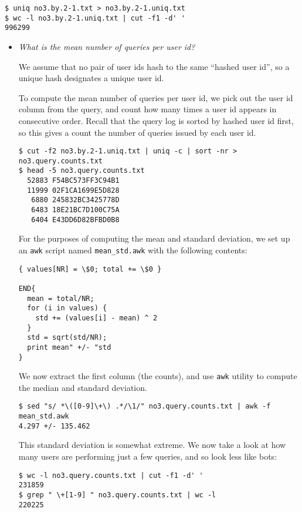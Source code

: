 \begin{lstlisting}
$ uniq no3.by.2-1.txt > no3.by.2-1.uniq.txt
$ wc -l no3.by.2-1.uniq.txt | cut -f1 -d' '
996299
\end{lstlisting}

\begin{itemize}

\item \emph{What is the mean number of queries per user id?}

We assume that no pair of user ids hash to the same ``hashed user id'',
so a unique hash designates a unique user id.

To compute the mean number of queries per user id, we pick out the user id
column from the query, and count how many times a user id appears in
consecutive order. Recall that the query log is sorted by hashed user id first,
so this gives a count the number of queries issued by each user id.

\begin{lstlisting}
$ cut -f2 no3.by.2-1.uniq.txt | uniq -c | sort -nr > no3.query.counts.txt
$ head -5 no3.query.counts.txt 
  52883 F54BC573FF3C94B1
  11999 02F1CA1699E5D828
   6880 245832BC3425778D
   6483 18E21BC7D100C75A
   6404 E43DD6D82BFBD0B8
\end{lstlisting}

For the purposes of computing the mean and standard deviation, we set up an
\texttt{awk} script named \texttt{mean\_std.awk} with the following contents:

\begin{lstlisting}
{ values[NR] = \$0; total += \$0 }

END{
  mean = total/NR;
  for (i in values) {
    std += (values[i] - mean) ^ 2
  }
  std = sqrt(std/NR);
  print mean" +/- "std
}
\end{lstlisting}

We now extract the first column (the counts), and use \texttt{awk} utility to
compute the median and standard deviation.

\begin{lstlisting}
$ sed "s/ *\([0-9]\+\) .*/\1/" no3.query.counts.txt | awk -f mean_std.awk
4.297 +/- 135.462
\end{lstlisting}

This standard deviation is somewhat extreme. We now take a look at how many
users are performing just a few queries, and so look less like bots:

\begin{lstlisting}
$ wc -l no3.query.counts.txt | cut -f1 -d' '
231859
$ grep " \+[1-9] " no3.query.counts.txt | wc -l
220225
\end{lstlisting}


\end{itemize}
